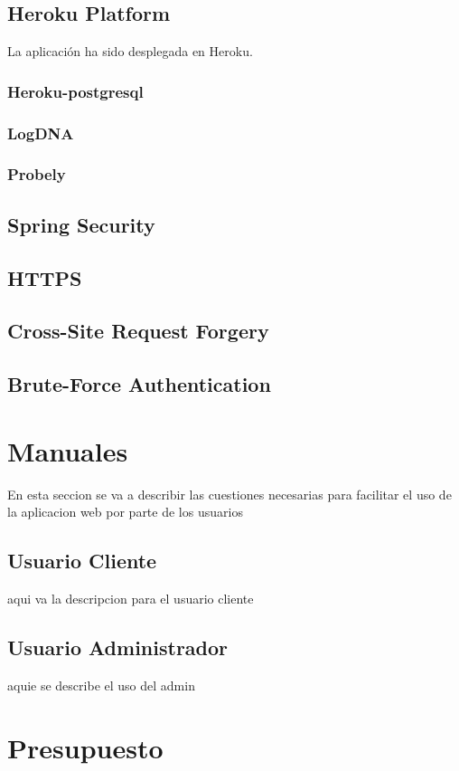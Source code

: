 \documentclass[a4paper]{article}
\begin{document}
        \subsection{Heroku Platform}
        La aplicación ha sido desplegada en Heroku.
            \subsubsection{Heroku-postgresql}
            \subsubsection{LogDNA}
            \subsubsection{Probely}
        \subsection{Spring Security} \label{sec:springsec}
        \subsection{HTTPS}
        \subsection{Cross-Site Request Forgery}
        \subsection{Brute-Force Authentication}

    \section{Manuales}
    En esta seccion se va a describir las cuestiones necesarias para facilitar el uso de la aplicacion web por parte de los usuarios
        \subsection{Usuario Cliente}
    aqui va la descripcion para el usuario cliente
        \subsection{Usuario Administrador}
    aquie se describe el uso del admin

	\section{Presupuesto}
\end{document}
